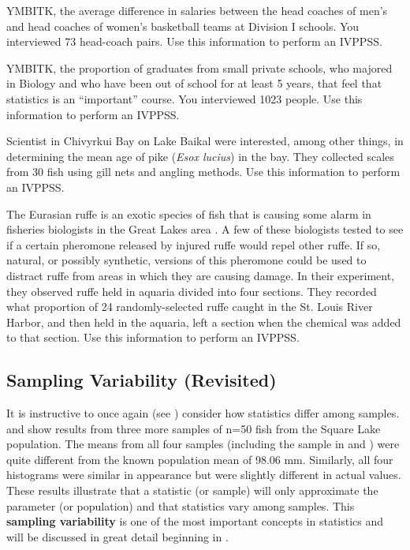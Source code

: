 \documentclass[10pt,openany]{book}\usepackage[]{graphicx}\usepackage[]{color}
\begin{document}
\begin{exsection}
  \item \label{revex:IVPPSSCoach}YMBITK, the average difference in salaries between the head coaches of men's and head coaches of women's basketball teams at Division I schools. You interviewed 73 head-coach pairs.  Use this information to perform an IVPPSS. 
  \item \label{revex:IVPPSSBioGrads}YMBITK, the proportion of graduates from small private schools, who majored in Biology and who have been out of school for at least 5 years, that feel that statistics is an ``important'' course. You interviewed 1023 people.  Use this information to perform an IVPPSS. 
  \item \label{revex:IVPPSSBaikal}Scientist in Chivyrkui Bay on Lake Baikal \citep{OwensPronin2000} were interested, among other things, in determining the mean age of pike (\textit{Esox lucius}) in the bay. They collected scales from 30 fish using gill nets and angling methods. Use this information to perform an IVPPSS. 
  \item \label{revex:IVPPSSRuffe}The Eurasian ruffe is an exotic species of fish that is causing some alarm in fisheries biologists in the Great Lakes area \citep{Maniaketal2000}. A few of these biologists tested to see if a certain pheromone released by injured ruffe would repel other ruffe.  If so, natural, or possibly synthetic, versions of this pheromone could be used to distract ruffe from areas in which they are causing damage. In their experiment, they observed ruffe held in aquaria divided into four sections.  They recorded what proportion of 24 randomly-selected ruffe caught in the St. Louis River Harbor, and then held in the aquaria, left a section when the chemical was added to that section.  Use this information to perform an IVPPSS. 
\end{exsection}


\subsection{Sampling Variability (Revisited)}
It is instructive to once again (see ) consider how statistics differ among samples.   and  show results from three more samples of n=50 fish from the Square Lake population.  The means from all four samples (including the sample in  and ) were quite different from the known population mean of 98.06 mm.  Similarly, all four histograms were similar in appearance but were slightly different in actual values. These results illustrate that a statistic (or sample) will only approximate the parameter (or population) and that statistics vary among samples.  This \textbf{sampling variability} is one of the most important concepts in statistics and will be discussed in great detail beginning in .
\end{document}
